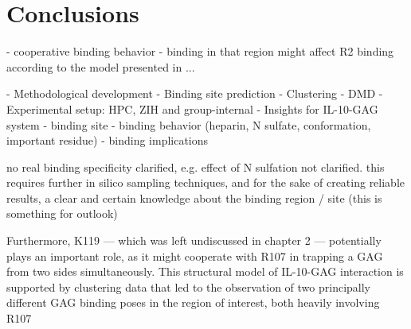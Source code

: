 \chapter{Conclusions}


- cooperative binding behavior
- binding in that region might affect R2 binding according to the model
    presented in ...




    - Methodological development
        - Binding site prediction
        - Clustering
        - DMD
        - Experimental setup: HPC, ZIH and group-internal
    - Insights for IL-10-GAG system
        - binding site
        - binding behavior (heparin, N sulfate, conformation, important residue)
        - binding implications


    no real binding specificity clarified, e.g. effect of N sulfation not clarified. this requires further in silico sampling techniques, and for the sake of creating reliable results, a clear and certain knowledge about the binding region / site (this is something for outlook)


    Furthermore, K119 — which
was left undiscussed in chapter 2 — potentially plays an important
role, as it might cooperate with R107 in trapping a GAG from two
sides simultaneously. This structural model of IL-10-GAG interaction
is supported by clustering data that led to the observation of two
principally different GAG binding poses in the region of interest, both
heavily involving R107